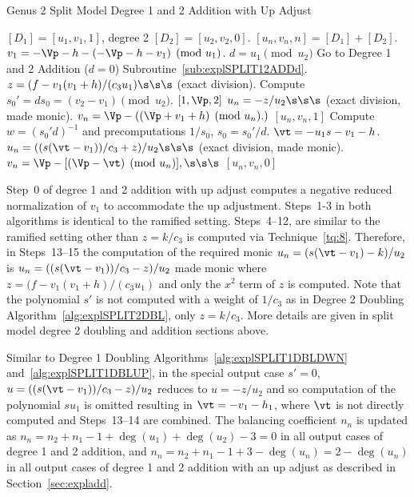 \begin{algorithm}[htbp]
\caption{Genus 2 Split Model Degree 1 and 2 Addition with Up Adjust\label{alg:explSPLIT12ADDUP}}
\begin{algorithmic} [1]
\Require $[D_1] = [u_1,v_1,1]$, degree 2 $[D_2] = [u_2,v_2,0]$.\smallskip
\Ensure $[u_n,v_n,n] = [D_1] + [D_2] $.
\algrule
\setcounter{ALG@line}{-1}
\State $v_1 = -\Vp - h - (-\Vp - h - v_1) \pmod{u_1}$.
\State $d = u_1 \pmod{u_2}$
    \State Go to Degree 1 and 2 Addition ($d = 0$) Subroutine~\ref{sub:explSPLIT12ADDd}.
\EndIf
\State $z = (f - v_1(v_1 + h)/(c_3u_1) \s\s\s$ (exact division).
\State Compute $s_0' = ds_0 = (v_2 - v_1) \pmod{u_2}$.
     \Return $[1,\Vp,2]$
    \EndIf
\Else 
    \State $u_n = -z/u_2 \s\s\s$ (exact division, made monic).
    \State $v_n = \Vp - ((\Vp + v_1 + h)  \pmod{u_n}.)$
    \State \Return $[u_n,v_n,1]$
\EndIf
\State Compute $w = (s_0'd)^{-1}$ and precomputations $1/s_0$, $s_0 = s_0'/d$.
\State $\vt = -u_1s - v_1 - h$.
\State $u_n = ((s(\vt - v_1))/c_3 + z)/u_2 \s\s\s$ (exact division, made monic).
\State $v_n = \Vp - [(\Vp - \vt) \pmod{u_n}], \s\s\s$
\State \Return $[u_n,v_n,0]$
\end{algorithmic}
\end{algorithm}


 
Step~0 of degree 1 and 2 addition with up adjust computes a negative reduced
normalization of $v_1$ to accommodate the up adjustment. Steps~1-3 in both
algorithms is identical to the ramified setting. Steps~4--12, are similar to the
ramified setting other than $z = k/c_3$ is computed via Technique~\ref{tq:8}.
Therefore, in Steps~13--15 the computation of the required monic $u_n = (s(\vt -
v_1) - k)/u_2$ is $u_n = ((s(\vt - v_1))/c_3 - z)/u_2$ made monic where $z = (f
- v_1(v_1 + h)/(c_3u_1)$ and only the $x^2$ term of $z$ is computed. Note that
the polynomial $s'$ is not computed with a weight of $1/c_3$ as in Degree 2
Doubling Algorithm~\ref{alg:explSPLIT2DBL}, only $z = k/c_3$. More details are
given in split model degree 2 doubling and addition sections above.

Similar to Degree 1 Doubling Algorithms~\ref{alg:explSPLIT1DBLDWN}
and~\ref{alg:explSPLIT1DBLUP}, in the special output case $s' = 0$, $u = ((s(\vt
- v_1))/c_3 - z)/u_2$ reduces to $u = -z/u_2$ and so computation of the
polynomial $su_1$ is omitted resulting in $\vt = -v_1 - h_1$, where $\vt$ is not
directly computed and Steps~13--14 are combined. The balancing coefficient $n_n$
is updated as $n_n = n_2 + n_1 - 1 + \deg(u_1) + \deg(u_2) - 3 = 0$ in all
output cases of degree 1 and 2 addition, and $n_n = n_2 + n_1 - 1 + 3 -
\deg(u_n) = 2 - \deg(u_n)$ in all output cases of degree 1 and 2 addition with
an up adjust as described in Section~\ref{sec:expladd}.

